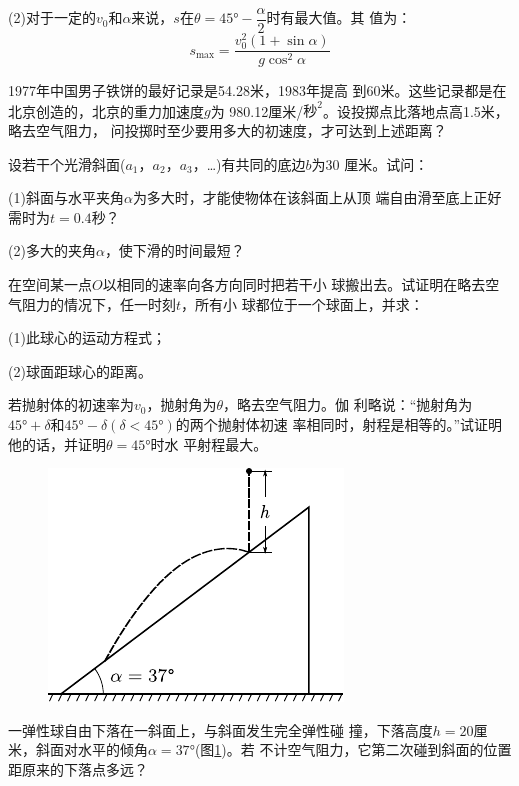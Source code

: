 (2)对于一定的$v_0$和$\alpha$来说，$s$在$\theta=\ang{45;;}-\dfrac{\alpha}{2}$时有最大值。其
值为：
\begin{equation*}
    s_{\max }=\frac{v_{0}^{2}(1+\sin \alpha)}{g \cos ^{2} \alpha}
\end{equation*}

\exercise 1977年中国男子铁饼的最好记录是54.28米，1983年提高
到60米。这些记录都是在北京创造的，北京的重力加速度$g$为
980.12厘米/$\text{秒}^2$。设投掷点比落地点高1.5米，略去空气阻力，
问投掷时至少要用多大的初速度，才可达到上述距离？

\exercise 设若干个光滑斜面($a_1$，$a_2$，$a_3$，…)有共同的底边$b$为30
厘米。试问：

(1)斜面与水平夹角$\alpha$为多大时，才能使物体在该斜面上从顶
端自由滑至底上正好需时为$t=0.4$秒？

(2)多大的夹角$\alpha$，使下滑的时间最短？

\exercise 在空间某一点$O$以相同的速率向各方向同时把若干小
球搬出去。试证明在略去空气阻力的情况下，任一时刻$t$，所有小
球都位于一个球面上，并求：

(1)此球心的运动方程式；

(2)球面距球心的距离。

\exercise 若抛射体的初速率为$v_0$，抛射角为$\theta$，略去空气阻力。伽
利略说：“抛射角为$\ang{45;;}+\delta$和$\ang{45;;}-\delta(\delta<\ang{45;;})$的两个抛射体初速
率相同时，射程是相等的。”试证明他的话，并证明$\theta=\ang{45;;}$时水
平射程最大。

\begin{figure}
    \vspace{-2.5em}
    \begin{center}
        \includegraphics{figure/fig01.31}
        \caption{}
        \label{fig:01.31}
    \end{center}
\end{figure}
\exercise 一弹性球自由下落在一斜面上，与斜面发生完全弹性碰
撞，下落高度$h=20$厘米，斜面对水平的倾角$\alpha=\ang{37;;}$(图\ref{fig:01.31})。若
不计空气阻力，它第二次碰到斜面的位置距原来的下落点多远？

